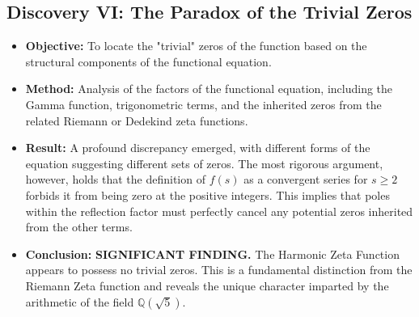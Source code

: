\documentclass{article}
\begin{document}
\subsection*{Discovery VI: The Paradox of the Trivial Zeros}
\begin{itemize}
    \item \textbf{Objective:} To locate the "trivial" zeros of the function based on the structural components of the functional equation.
    \item \textbf{Method:} Analysis of the factors of the functional equation, including the Gamma function, trigonometric terms, and the inherited zeros from the related Riemann or Dedekind zeta functions.
    \item \textbf{Result:} A profound discrepancy emerged, with different forms of the equation suggesting different sets of zeros. The most rigorous argument, however, holds that the definition of $f(s)$ as a convergent series for $s \geq 2$ forbids it from being zero at the positive integers. This implies that poles within the reflection factor must perfectly cancel any potential zeros inherited from the other terms.
    \item \textbf{Conclusion:} \textbf{SIGNIFICANT FINDING.} The Harmonic Zeta Function appears to possess no trivial zeros. This is a fundamental distinction from the Riemann Zeta function and reveals the unique character imparted by the arithmetic of the field $\mathbb{Q}(\sqrt{5})$.
\end{itemize}
\end{document}
